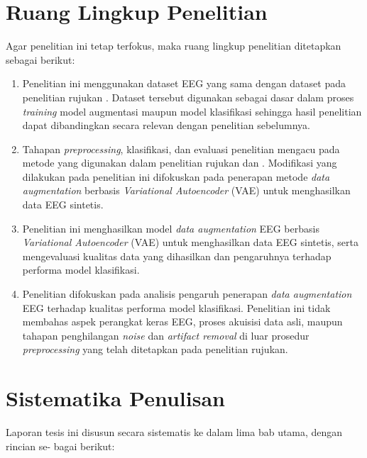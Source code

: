 \section{Ruang Lingkup Penelitian}
\label{sec:ruang_lingkup}
Agar penelitian ini tetap terfokus, maka ruang lingkup penelitian ditetapkan sebagai berikut:
\begin{enumerate}

\item {} Penelitian ini menggunakan dataset EEG yang sama dengan dataset pada penelitian rujukan \cite{paper_ref}\cite{eeg_dataset_asd}. Dataset tersebut digunakan sebagai dasar dalam proses \textit{training} model augmentasi maupun model klasifikasi sehingga hasil penelitian dapat dibandingkan secara relevan dengan penelitian sebelumnya.

\item {} Tahapan \textit{preprocessing}, klasifikasi, dan evaluasi penelitian mengacu pada metode yang digunakan dalam penelitian rujukan \cite{paper_ref} dan \cite{eeg_gan}. Modifikasi yang dilakukan pada penelitian ini difokuskan pada penerapan metode \textit{data augmentation} berbasis \textit{Variational Autoencoder} (VAE) untuk menghasilkan data EEG sintetis.

\item {} Penelitian ini menghasilkan model \textit{data augmentation} EEG berbasis \textit{Variational Autoencoder} (VAE) untuk menghasilkan data EEG sintetis, serta mengevaluasi kualitas data yang dihasilkan dan pengaruhnya terhadap performa model klasifikasi.

\item {} Penelitian difokuskan pada analisis pengaruh penerapan \textit{data augmentation} EEG terhadap kualitas performa model klasifikasi. Penelitian ini tidak membahas aspek perangkat keras EEG, proses akuisisi data asli, maupun tahapan penghilangan \textit{noise} dan \textit{artifact removal} di luar prosedur \textit{preprocessing} yang telah ditetapkan pada penelitian rujukan.
\end{enumerate}
\section{Sistematika Penulisan}
\label{sec:sistematika}
Laporan tesis ini disusun secara sistematis ke dalam lima bab utama, dengan rincian se-
bagai berikut:

